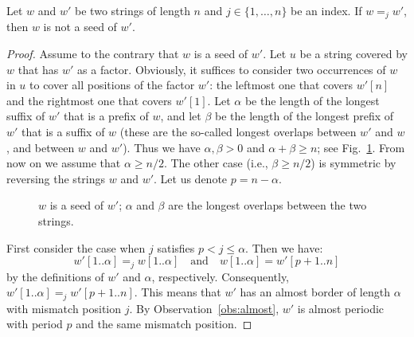 \documentclass{article}
\begin{document}
  \begin{lemma}\label{lem:main}
    Let $w$ and $w'$ be two strings of length $n$ and $j \in \{1,\ldots,n\}$ be an index.
    If $w =_j w'$, then $w$ is not a seed of $w'$.
  \end{lemma}
  \begin{proof}
    Assume to the contrary that $w$ is a seed of $w'$.
    Let $u$ be a string covered by $w$ that has $w'$ as a factor.
    Obviously, it suffices to consider two occurrences of $w$ in $u$ to cover all positions of the factor $w'$:
    the leftmost one that covers $w'[n]$
    and
    the rightmost one that covers $w'[1]$.
    Let $\alpha$ be the length of the longest suffix of $w'$ that is a prefix of $w$, and
    let $\beta$ be the length of the longest prefix of $w'$ that is a suffix of $w$
    (these are the so-called longest overlaps between $w'$ and $w$, and between $w$ and $w'$).
    Thus we have $\alpha,\beta>0$ and $\alpha+\beta \ge n$; see Fig.~\ref{fig:pref_suf}.
    From now on we assume that $\alpha \ge n/2$.
    The other case (i.e., $\beta \ge n/2$) is symmetric by reversing the strings $w$ and $w'$.
    Let us denote $p=n-\alpha$.

    \begin{figure}[htpb]
    \begin{center}
    
    \end{center}
    \caption{
      $w$ is a seed of $w'$; $\alpha$ and $\beta$ are the longest overlaps between the two strings.
    }\label{fig:pref_suf}
    \end{figure}

    First consider the case when $j$ satisfies $p < j \le \alpha$.
    Then we have:
    $$w'[1..\alpha] =_j w[1..\alpha] \quad\mbox{and}\quad w[1..\alpha] = w'[p+1..n]$$
    by the definitions of $w'$ and $\alpha$, respectively.
    Consequently, $w'[1..\alpha] =_j w'[p+1..n]$.
    This means that $w'$ has an almost border of length $\alpha$ with mismatch position $j$.
    By Observation~\ref{obs:almost}, $w'$ is almost periodic with period $p$ and the same mismatch position.


\end{proof}
\end{document}
